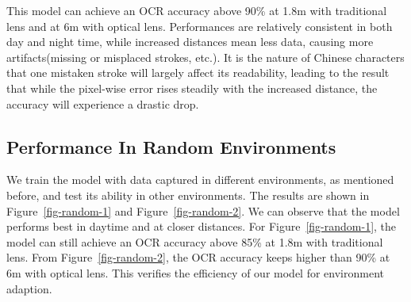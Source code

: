 This model can achieve an OCR accuracy above 90\% at 1.8m with traditional lens and at 6m with optical lens. Performances are relatively consistent in both day and night time, while increased distances mean less data, causing more artifacts(missing or misplaced strokes, etc.). It is the nature of Chinese characters that one mistaken stroke will largely affect its readability, leading to the result that while the pixel-wise error rises steadily with the increased distance, the accuracy will experience a drastic drop.

\subsection{Performance In Random Environments}
We train the model with data captured in different environments, as mentioned before, and test its ability in other environments. The results are shown in Figure~\ref{fig-random-1} and Figure~\ref{fig-random-2}. We can observe that the model performs best in daytime and at closer distances. For Figure~\ref{fig-random-1}, the model can still achieve an OCR accuracy above 85\% at 1.8m with traditional lens. From Figure~\ref{fig-random-2}, the OCR accuracy keeps higher than 90\% at 6m with optical lens. This verifies the efficiency of our model for environment adaption.


